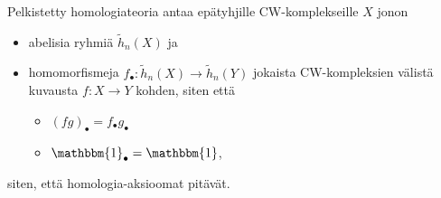 \begin{maaritelma}
    Pelkistetty homologiateoria antaa epätyhjille CW-komplekseille $X$ jonon
    \begin{itemize}
        \item abelisia ryhmiä $\tilde h_n(X)$ ja
        \item homomorfismeja $f_\bullet:\tilde h_n(X)\to\tilde h_n(Y)$ jokaista CW-kompleksien välistä kuvausta $f:X\to Y$ kohden, siten että
        \begin{itemize}
            \item $(fg)_\bullet=f_\bullet g_\bullet$
            \item $\mathbbm{1}_\bullet=\mathbbm{1}$,
        \end{itemize}
    \end{itemize}
    siten, että homologia-aksioomat pitävät.
\end{maaritelma}
